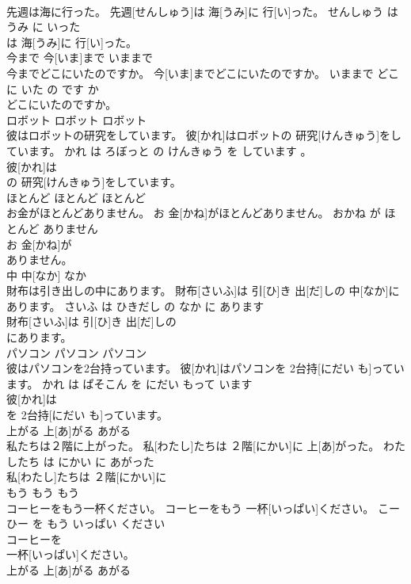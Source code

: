 \documentclass[8pt]{extreport}
\begin{document}
\begin{CJK}{UTF8}{min}
\\	先週は海に行った。	先週[せんしゅう]は 海[うみ]に 行[い]った。	せんしゅう は うみ に いった	
\\	は 海[うみ]に 行[い]った。			
\\	今まで	今[いま]まで	いままで	
\\	今までどこにいたのですか。	今[いま]までどこにいたのですか。	いままで どこ に いた の です か	
\\	どこにいたのですか。			
\\	ロボット	ロボット	ロボット	
\\	彼はロボットの研究をしています。	彼[かれ]はロボットの 研究[けんきゅう]をしています。	かれ は ろぼっと の けんきゅう を しています 。	
\\	彼[かれ]は
\\	の 研究[けんきゅう]をしています。			
\\	ほとんど	ほとんど	ほとんど	
\\	お金がほとんどありません。	お 金[かね]がほとんどありません。	おかね が ほとんど ありません	
\\	お 金[かね]が
\\	ありません。			
\\	中	中[なか]	なか	
\\	財布は引き出しの中にあります。	財布[さいふ]は 引[ひ]き 出[だ]しの 中[なか]にあります。	さいふ は ひきだし の なか に あります	
\\	財布[さいふ]は 引[ひ]き 出[だ]しの
\\	にあります。			
\\	パソコン	パソコン	パソコン	
\\	彼はパソコンを2台持っています。	彼[かれ]はパソコンを 2台持[にだい も]っています。	かれ は ぱそこん を にだい もって います	
\\	彼[かれ]は
\\	を 2台持[にだい も]っています。			
\\	上がる	上[あ]がる	あがる	
\\	私たちは２階に上がった。	私[わたし]たちは ２階[にかい]に 上[あ]がった。	わたしたち は にかい に あがった	
\\	私[わたし]たちは ２階[にかい]に
\\	もう	もう	もう	
\\	コーヒーをもう一杯ください。	コーヒーをもう 一杯[いっぱい]ください。	こーひー を もう いっぱい ください	
\\	コーヒーを
\\	一杯[いっぱい]ください。			
\\	上がる	上[あ]がる	あがる	

\end{CJK}
\end{document}
